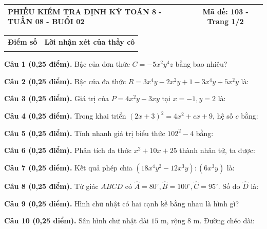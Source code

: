 \documentclass[12pt,a4paper]{article}
\begin{document}
\newpage
\noindent
\begin{tabularx}{\linewidth}{|X|c|}
\hline
\textbf{PHIẾU KIỂM TRA ĐỊNH KỲ TOÁN 8 - TUẦN 08 - BUỔI 02} & \textbf{Mã đề: 103 - Trang 1/2} \\
\hline
\end{tabularx}

\vspace{1.2mm}

\noindent
\begin{tabularx}{\linewidth}{|p{3.2cm}|X|}
\hline
\centering\textbf{Điểm số} & \centering\textbf{Lời nhận xét của thầy cô} \tabularnewline
\rule{0pt}{1.8cm} & \\
\hline
\end{tabularx}

\vspace{1.2mm}

\noindent\textbf{Câu 1 (0,25 điểm).} Bậc của đơn thức $C = -5x^2 y^4 z$ bằng bao nhiêu? \par\vspace{0.3mm}
\noindent\textbf{Câu 2 (0,25 điểm).} Bậc của đa thức $R = 3x^4 y - 2x^2 y + 1 - 3x^4 y + 5x^2 y$ là: \par\vspace{0.3mm}
\noindent\textbf{Câu 3 (0,25 điểm).} Giá trị của $P = 4x^2 y - 3xy$ tại $x = -1, y = 2$ là: \par\vspace{0.3mm}
\noindent\textbf{Câu 4 (0,25 điểm).} Trong khai triển $(2x + 3)^2 = 4x^2 + cx + 9$, hệ số $c$ bằng: \par\vspace{0.3mm}
\noindent\textbf{Câu 5 (0,25 điểm).} Tính nhanh giá trị biểu thức $102^2 - 4$ bằng: \par\vspace{0.3mm}
\noindent\textbf{Câu 6 (0,25 điểm).} Phân tích đa thức $x^2 + 10x + 25$ thành nhân tử, ta được: \par\vspace{0.3mm}
\noindent\textbf{Câu 7 (0,25 điểm).} Kết quả phép chia $(18x^4 y^2 - 12x^3 y) : (6x^3 y)$ là: \par\vspace{0.3mm}
\noindent\textbf{Câu 8 (0,25 điểm).} Tứ giác $ABCD$ có $\widehat{A}=80^\circ, \widehat{B}=100^\circ, \widehat{C}=95^\circ$. Số đo $\widehat{D}$ là: \par\vspace{0.3mm}
\noindent\textbf{Câu 9 (0,25 điểm).} Hình chữ nhật có hai cạnh kề bằng nhau là hình gì? \par\vspace{0.3mm}
\noindent\textbf{Câu 10 (0,25 điểm).} Sân hình chữ nhật dài $15\text{ m}$, rộng $8\text{ m}$. Đường chéo dài: \par\vspace{0.3mm}
\end{document}
